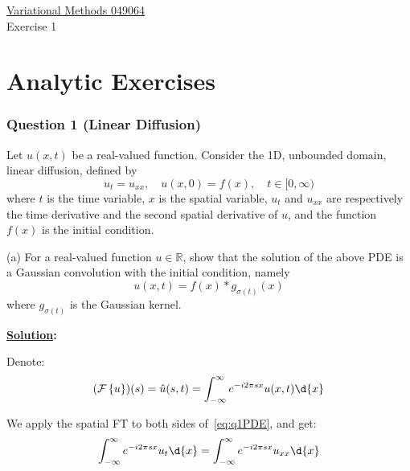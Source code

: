 \documentclass{article}
\begin{document}
\begin{center}
  {\huge \underline{Variational Methods 049064} \\[7pt] Exercise 1}
\end{center}
\part{Analytic Exercises}
\section*{Question 1 (Linear Diffusion)}
Let $u(x,t)$ be a real-valued function. Consider the 1D, unbounded domain, linear diffusion, defined by
\begin{equation} \label{eq:q1PDE}
u_t = u_{xx}, \quad u(x,0) = f(x), \quad t \in [0, \infty)
\end{equation}
where \(t\) is the time variable, \(x\) is the spatial variable, \(u_t\) and \(u_{xx}\) are respectively the time derivative and the second spatial derivative of \(u\), and the function \(f(x)\) is the initial condition.

(a) For a real-valued function \(u \in \mathbb{R}\), show that the solution of the above PDE is a Gaussian convolution with the initial condition, namely
\begin{equation}
  u(x,t) = f(x) * g_{\sigma(t)}(x)
\end{equation}
where $g_{\sigma(t)}$ is the Gaussian kernel.

\textbf{\ul{Solution}:} 

Denote:
\[
  (\mathcal{F} \left\{ u \right\})(s) =   \hat{u}(s,t) = \int_{-\infty}^{\infty} e^{-i 2 \pi s x} u(x,t) \d{x}
\]

We apply the spatial FT to both sides of~\cref{eq:q1PDE}, and get:
\[
  \int_{-\infty}^{\infty} e^{- i 2 \pi s x} u_{t} \d{x} = \int_{-\infty}^{\infty} e^{-i 2\pi s x} u_{xx}   \d{x}
\]
\end{document}
